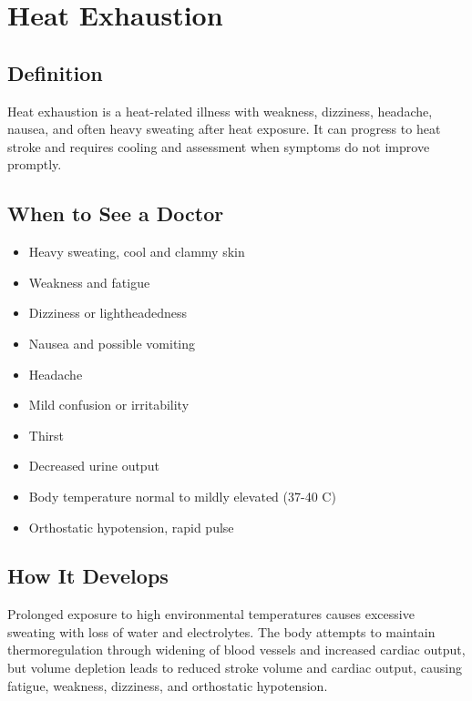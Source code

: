 \chapter{Heat Exhaustion}

\section*{Definition}
Heat exhaustion is a heat-related illness with weakness, dizziness, headache, nausea, and often heavy sweating after heat exposure. It can progress to heat stroke and requires cooling and assessment when symptoms do not improve promptly.

\section*{When to See a Doctor}
\begin{itemize}
\item Heavy sweating, cool and clammy skin
\item Weakness and fatigue
\item Dizziness or lightheadedness
\item Nausea and possible vomiting
\item Headache
\item Mild confusion or irritability
\item Thirst
\item Decreased urine output
\item Body temperature normal to mildly elevated (37-40 C)
\item Orthostatic hypotension, rapid pulse
\end{itemize}

\section*{How It Develops}
Prolonged exposure to high environmental temperatures causes excessive sweating with loss of water and electrolytes. The body attempts to maintain thermoregulation through widening of blood vessels and increased cardiac output, but volume depletion leads to reduced stroke volume and cardiac output, causing fatigue, weakness, dizziness, and orthostatic hypotension.


